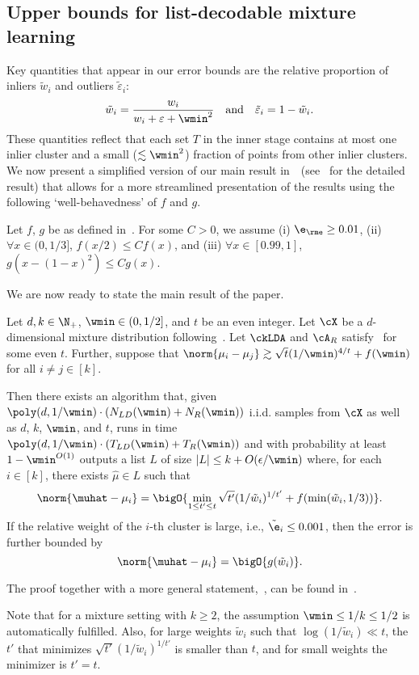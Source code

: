 \subsection{Upper bounds for list-decodable mixture learning}
\label{sec:ub_lb_sep}
Key quantities that appear in our error bounds are the relative proportion of inliers $\tilde w_i$ and outliers  $\tilde \varepsilon_i$:
\begin{equation}
\label{eq:rel_weights}
\tilde w_i = \frac{w_i}{w_i + \varepsilon + \wmin^2} \quad \text{and} \quad \tilde \varepsilon_i = 1 - \tilde w_i.
\end{equation}
These quantities reflect that each set \(T\) in the inner stage contains at most one inlier cluster and a small (\(\lesssim \wmin^2\)) fraction of points from other inlier clusters.
We now present a simplified version of our main result in~~(see~ for the detailed result) 
that allows for a more streamlined presentation of the results using 
the following `well-behavedness' of \(f\) and \(g\).
\begin{assumption}
    \label{asm:well-behaved} 
    Let \(f\), \(g\) be as defined in~. For some \(C > 0\), we assume (i) \(\e_{\rme} \geq 0.01\), (ii) $\forall x \in (0, 1/3]$, $f(x/2) \leq C f(x)$, and (iii) $\forall x \in [0.99, 1]$, $g(x - (1-x)^2) \leq C g(x)$.
\end{assumption}
We are now ready to state the main result of the paper.
\begin{theorem}
\label{thm:informal}
    Let $d, k \in \N_+$, $\wmin \in (0, 1/2]$, and $t$ be an even integer. 
Let $\cX$ be a $d$-dimensional mixture distribution following~.
Let \(\ckLDA\) and \(\cA_R\) satisfy~ for some even \(t\). 
Further, suppose that $\norm{\mu_i - \mu_j} \gtrsim \sqrt{t}(1/\wmin)^{4/t} + f(\wmin)$ for all $i \neq j \in [k]$.

Then there exists an algorithm that, given ${\poly(d, 1/\wmin) \cdot (N_{LD}(\wmin) + N_R(\wmin))}$ i.i.d. samples from $\cX$ as well as $d$, $k$, $\wmin$, and $t$, runs in time ${\poly(d, 1/\wmin) \cdot (T_{LD}(\wmin) + T_R(\wmin))}$ and with probability at least $1-\wmin^{O(1)}$ outputs a list $L$ of size ${|L| \leq k + O(\epsilon/\wmin)}$ where, for each $i \in [k]$, there exists $\hat\mu \in L$ such that
    \[\norm{\muhat - \mu_i} = \bigO{\min_{1\le t'\le t}\sqrt{t'} (1 / \tilde w_i)^{1/t'}+f(\min(\tilde{w}_i, 1/3))}.\]
    If the relative weight of the \(i\)-th cluster is large, i.e., \(\tilde \e_i \leq 0.001\), then the error is further bounded by
    \[\norm{\muhat - \mu_i} = \bigO{g(\tilde{w}_i)}.\]
\end{theorem}
The proof together with a more general statement,~, can be found in~.

Note that for a mixture setting with $k\geq 2$, the assumption \(\wmin \leq 1 / k \leq 1/2 \) is automatically fulfilled.
Also, for large weights $\tilde w_i$ such that $\log(1 / \tilde w_i) \ll t$, the $t'$ that minimizes $\sqrt{t'} (1 / \tilde w_i)^{1/t'}$ is smaller than $t$, and for small weights the minimizer is $t'=t$.
